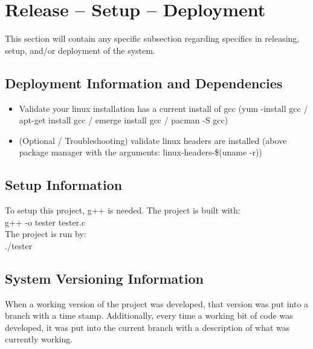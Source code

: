 
\chapter{Release -- Setup -- Deployment}
This section will contain any specific subsection regarding specifics in releasing, 
setup, and/or deployment of the system. 


\section{Deployment Information and Dependencies}
\begin {itemize}
\item Validate your linux installation has a current install of gcc (yum -install gcc / apt-get install gcc / emerge install gcc  / pacman -S gcc)
\item (Optional / Troubleshooting) validate linux headers are installed (above package manager with the arguments: linux-headers-\$(uname -r))
\end {itemize}



\section{Setup Information}

To setup this project, g++ is needed. The project is built with: \\
g++ -o  tester tester.c
\\
The project is run by: \\
./tester 

\section{System  Versioning Information}
When a working version of the project was developed, that version was put into a branch with a time stamp. 
Additionally, every time a working bit of code was developed, it was put into the current branch with 
a description of what was currently working.

